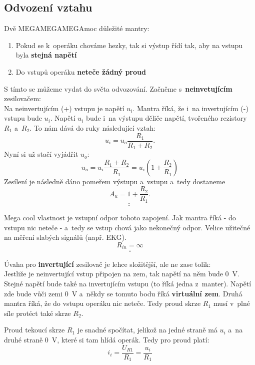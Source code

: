 \documentclass[a4paper,12pt]{article}   %
\begin{document}
\subsection*{Odvození vztahu}
Dvě MEGAMEGAMEGAmoc důležité mantry:
\begin{enumerate}
    \item Pokud se k~operáku chováme hezky, tak si výstup řídí tak, aby na vstupu byla \textbf{stejná napětí}
    \item Do vstupů operáku \textbf{neteče žádný proud}
\end{enumerate}

S tímto se můžeme vydat do světa odvozování. Začněme s~\textbf{neinvetujícím} zesilovačem:\\
Na neinvertujícím (+) vstupu je napětí $u_i$. Mantra říká, že i~na invertujícím (-) vstupu bude $u_i$. Napětí $u_i$ bude i~na výstupu děliče napětí, tvořeného rezistory $R_1$ a~$R_2$. To nám dává do ruky následující vztah:
\begin{equation*}
    u_i = u_o \frac{R_1}{R_1 + R_2}.
\end{equation*}
Nyní si už stačí vyjádřit $u_o$:
\begin{equation*}
    u_o = u_i \frac{R_1 + R_2}{R_1} = u_i (1+\frac{R_2}{R_1})
\end{equation*}
Zesílení je následně dáno pomeřem výstupu a~vstupu a~tedy dostaneme
\begin{equation*}
    \underline{\underline{A_u = 1+\frac{R_2}{R_1}}}.
\end{equation*}

Mega cool vlastnost je vstupní odpor tohoto zapojení. Jak mantra říká - do vstupu nic neteče - a~tedy se vstup chová jako nekonečný odpor. Velice užitečné na měření slabých signálů (např. EKG).
\begin{equation*}
    \underline{\underline{R_{in} = \infty}}
\end{equation*}

Úvaha pro \textbf{invertující} zesilovač je lehce složitější, ale ne zase tolik:\\
Jestliže je neinvertující vstup připojen na zem, tak napětí na něm bude $0$~V. Stejné napětí bude také na invertujícím vstupu (to říká jedna z~manter). Napětí zde bude vůči zemi 0~V a~někdy se tomuto bodu říká \textbf{virtuální zem}. Druhá mantra říká, že do vstupu operáku nic neteče. Tedy proud skrze $R_1$ musí v~plné síle protéct také skrze $R_2$.

Proud tekoucí skrze $R_1$ je snadné spočítat, jelikož na jedné straně má $u_i$ a~na druhé straně 0~V, které si tam hlídá operák. Tedy pro proud platí:
\begin{equation*}
    i_i = \frac{U_{R1}}{R_1} = \frac{u_i}{R_1}
\end{equation*}
\end{document}
